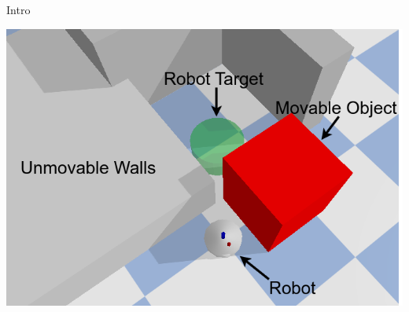 \begin{frame}[fragile]{Intro}
\vspace{-0.7cm}
\begin{center}
\includegraphics[height=0.9\textheight]{figures/introduction/robot_with_target}
\end{center}
\end{frame}


